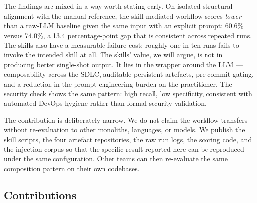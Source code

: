 \documentclass[journal]{IEEEtran}
\begin{document}
The findings are mixed in a way worth stating early. On isolated
structural alignment with the manual reference, the skill-mediated
workflow scores \emph{lower} than a raw-LLM baseline given the same
input with an explicit prompt: 60.6\% versus 74.0\%, a 13.4
percentage-point gap that is consistent across repeated runs. The
skills also have a measurable failure cost: roughly one in ten runs
fails to invoke the intended skill at all. The skills' value, we
will argue, is not in producing better single-shot output. It lies
in the wrapper around the LLM --- composability across the SDLC,
auditable persistent artefacts, pre-commit gating, and a reduction
in the prompt-engineering burden on the practitioner. The security
check shows the same pattern: high recall, low specificity,
consistent with automated DevOps hygiene rather than formal security
validation.

The contribution is deliberately narrow. We do not claim the workflow
transfers without re-evaluation to other monoliths, languages, or
models. We publish the skill scripts, the four artefact repositories,
the raw run logs, the scoring code, and the injection corpus so that
the specific result reported here can be reproduced under the same
configuration. Other teams can then re-evaluate the same composition
pattern on their own codebases.

\subsection{Contributions}
\end{document}
